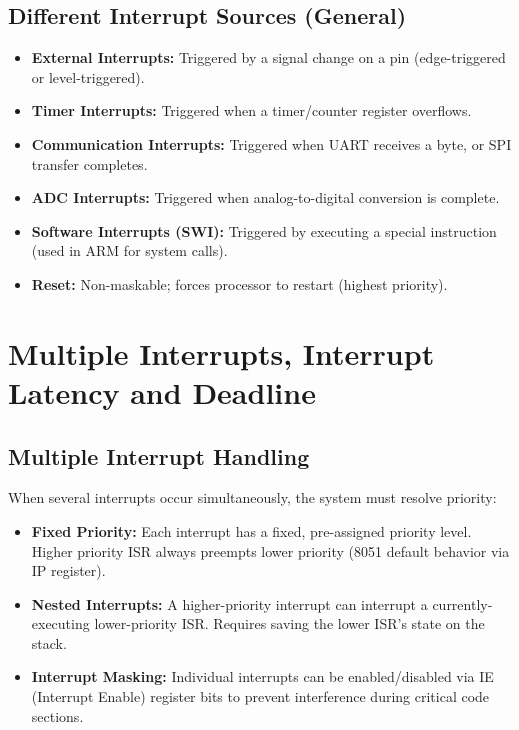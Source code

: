 \documentclass[12pt,a4paper]{article}
\begin{document}
\subsection{Different Interrupt Sources (General)}
\begin{itemize}[leftmargin=*, itemsep=3pt]
  \item \textbf{External Interrupts:} Triggered by a signal change on a pin (edge-triggered or level-triggered).
  \item \textbf{Timer Interrupts:} Triggered when a timer/counter register overflows.
  \item \textbf{Communication Interrupts:} Triggered when UART receives a byte, or SPI transfer completes.
  \item \textbf{ADC Interrupts:} Triggered when analog-to-digital conversion is complete.
  \item \textbf{Software Interrupts (SWI):} Triggered by executing a special instruction (used in ARM for system calls).
  \item \textbf{Reset:} Non-maskable; forces processor to restart (highest priority).
\end{itemize}

\section{Multiple Interrupts, Interrupt Latency and Deadline}

\subsection{Multiple Interrupt Handling}

When several interrupts occur simultaneously, the system must resolve priority:

\begin{itemize}[leftmargin=*, itemsep=3pt]
  \item \textbf{Fixed Priority:} Each interrupt has a fixed, pre-assigned priority level. Higher priority ISR always preempts lower priority (8051 default behavior via IP register).
  \item \textbf{Nested Interrupts:} A higher-priority interrupt can interrupt a currently-executing lower-priority ISR. Requires saving the lower ISR's state on the stack.
  \item \textbf{Interrupt Masking:} Individual interrupts can be enabled/disabled via IE (Interrupt Enable) register bits to prevent interference during critical code sections.
\end{itemize}
\end{document}

